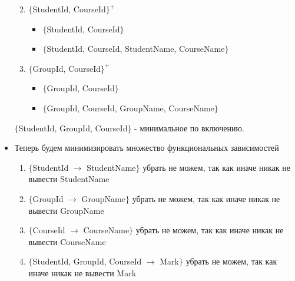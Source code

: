 \documentclass[12pt,a4paper,oneside]{article}
\begin{document}
\begin{itemize}
\begin{enumerate}
\begin{itemize}
\end{itemize}

\item $\{$StudentId, CourseId$\}^{+}$

\begin{itemize}

\item $\{$StudentId, CourseId$\}$

\item $\{$StudentId, CourseId, StudentName, CourseName$\}$

\end{itemize}

\item $\{$GroupId, CourseId$\}^{+}$

\begin{itemize}

\item $\{$GroupId, CourseId$\}$

\item $\{$GroupId, CourseId, GroupName, CourseName$\}$

\end{itemize}

\end{enumerate}

\medskip

$\{$StudentId, GroupId, CourseId$\}$ - минимальное по включению.

\medskip

\item Теперь будем минимизировать множество функциональных зависимостей

\begin{enumerate}

\item $\{$StudentId $\rightarrow$ StudentName$\}$ убрать не можем, так как иначе никак не вывести StudentName

\item $\{$GroupId $\rightarrow$ GroupName$\}$ убрать не можем, так как иначе никак не вывести GroupName

\item $\{$CourseId $\rightarrow$ CourseName$\}$ убрать не можем, так как иначе никак не вывести CourseName

\item $\{$StudentId, GroupId, CourseId $\rightarrow$ Mark$\}$ убрать не можем, так как иначе никак не вывести Mark

\end{enumerate}


\end{itemize}
\end{document}
